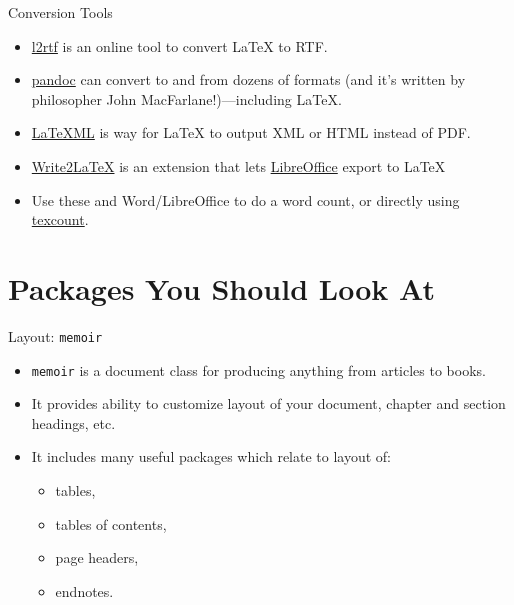 \begin{frame}{Conversion Tools}

\begin{itemize}
\item \href{http://www.sciweavers.org/convert-latex-to-rtf}{l2rtf}
  is an online tool to convert \LaTeX{} to RTF.
\item \href{http://johnmacfarlane.net/pandoc/}{pandoc} can convert to
  and from dozens of formats (and it's written by philosopher
  John MacFarlane!)---including \LaTeX.
\item \href{http://dlmf.nist.gov/LaTeXML/}{LaTeXML} is
  way for \LaTeX{} to output XML or HTML instead of PDF. 
\item
  \href{https://extensions.libreoffice.org/extensions/writer2latex-1}{Write2LaTeX}
  is an extension that lets
  \href{http://www.libreoffice.org/}{LibreOffice} export to \LaTeX{}
\item Use these and Word/LibreOffice to do a word count, or directly
  using \href{http://app.uio.no/ifi/texcount/index.html}{texcount}.
\end{itemize}

\end{frame}




\section{Packages You Should Look At}


\begin{frame}{Layout: \texttt{memoir}}

\begin{itemize}
\item \texttt{memoir} is a document class for producing anything from
  articles to books.
\item It provides ability to customize layout of your document,
  chapter and section headings, etc.
\item It includes many useful packages which relate to layout of:
\begin{itemize}
\item tables,
\item tables of contents,
\item page headers,
\item endnotes.
\end{itemize}
\end{itemize}

\end{frame}

